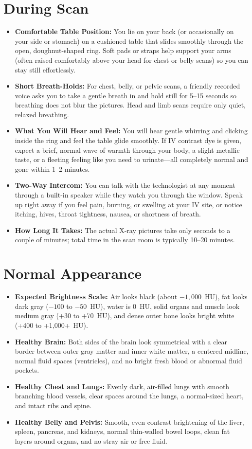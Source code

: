 \section{During Scan}
\begin{itemize}
    \item \textbf{Comfortable Table Position:} You lie on your back (or occasionally on your side or stomach) on a cushioned table that slides smoothly through the open, doughnut-shaped ring. Soft pads or straps help support your arms (often raised comfortably above your head for chest or belly scans) so you can stay still effortlessly.
    \item \textbf{Short Breath-Holds:} For chest, belly, or pelvic scans, a friendly recorded voice asks you to take a gentle breath in and hold still for 5--15 seconds so breathing does not blur the pictures. Head and limb scans require only quiet, relaxed breathing.
    \item \textbf{What You Will Hear and Feel:} You will hear gentle whirring and clicking inside the ring and feel the table glide smoothly. If IV contrast dye is given, expect a brief, normal wave of warmth through your body, a slight metallic taste, or a fleeting feeling like you need to urinate---all completely normal and gone within 1--2 minutes.
    \item \textbf{Two-Way Intercom:} You can talk with the technologist at any moment through a built-in speaker while they watch you through the window. Speak up right away if you feel pain, burning, or swelling at your IV site, or notice itching, hives, throat tightness, nausea, or shortness of breath.
    \item \textbf{How Long It Takes:} The actual X-ray pictures take only seconds to a couple of minutes; total time in the scan room is typically 10--20 minutes.
\end{itemize}

\section{Normal Appearance}
\begin{itemize}
    \item \textbf{Expected Brightness Scale:} Air looks black (about $-1,000$~HU), fat looks dark gray ($-100$ to $-50$~HU), water is 0~HU, solid organs and muscle look medium gray (+30 to +70~HU), and dense outer bone looks bright white (+400 to +1,000+~HU).
    \item \textbf{Healthy Brain:} Both sides of the brain look symmetrical with a clear border between outer gray matter and inner white matter, a centered midline, normal fluid spaces (ventricles), and no bright fresh blood or abnormal fluid pockets.
    \item \textbf{Healthy Chest and Lungs:} Evenly dark, air-filled lungs with smooth branching blood vessels, clear spaces around the lungs, a normal-sized heart, and intact ribs and spine.
    \item \textbf{Healthy Belly and Pelvis:} Smooth, even contrast brightening of the liver, spleen, pancreas, and kidneys, normal thin-walled bowel loops, clean fat layers around organs, and no stray air or free fluid.
\end{itemize}


